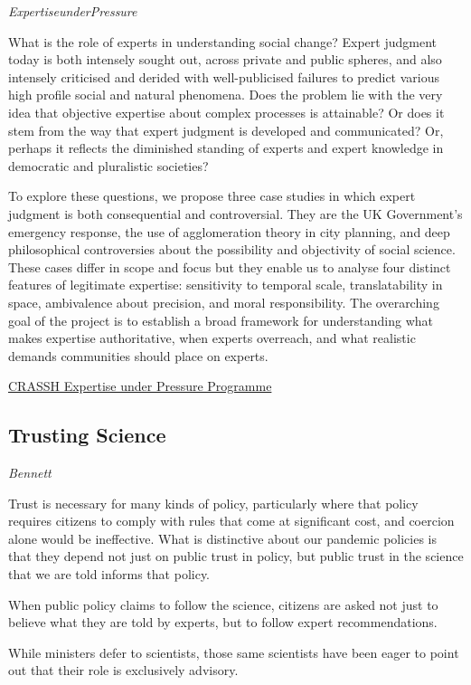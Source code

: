 \documentclass[
]{book}
\begin{document}
\emph{ExpertiseunderPressure}

What is the role of experts in understanding social change? Expert judgment today is both intensely sought out, across private and public spheres, and also intensely criticised and derided with well-publicised failures to predict various high profile social and natural phenomena. Does the problem lie with the very idea that objective expertise about complex processes is attainable? Or does it stem from the way that expert judgment is developed and communicated? Or, perhaps it reflects the diminished standing of experts and expert knowledge in democratic and pluralistic societies?

To explore these questions, we propose three case studies in which expert judgment is both consequential and controversial. They are the UK Government's emergency response, the use of agglomeration theory in city planning, and deep philosophical controversies about the possibility and objectivity of social science. These cases differ in scope and focus but they enable us to analyse four distinct features of legitimate expertise: sensitivity to temporal scale, translatability in space, ambivalence about precision, and moral responsibility. The overarching goal of the project is to establish a broad framework for understanding what makes expertise authoritative, when experts overreach, and what realistic demands communities should place on experts.

\href{http://www.crassh.cam.ac.uk/programmes/expertise-under-pressure}{CRASSH Expertise under Pressure Programme}

\hypertarget{trusting-science}{%
\subsection{Trusting Science}\label{trusting-science}}

\emph{Bennett}

Trust is necessary for many kinds of policy, particularly where that policy requires citizens to comply with rules that come at significant cost, and coercion alone would be ineffective.
What is distinctive about our pandemic policies is that they depend not just on public trust in policy, but public trust in the science that we are told informs that policy.

When public policy claims to follow the science, citizens are asked not just to believe what they are told by experts, but to follow expert recommendations.

While ministers defer to scientists, those same scientists have been eager to point out that their role is exclusively advisory.
\end{document}
